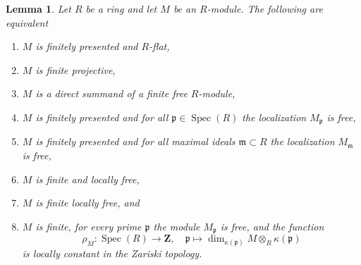 \documentclass{amsart}
\theoremstyle{plain}
\newtheorem{lemma}[subsection]{Lemma}
\theoremstyle{definition}
\theoremstyle{remark}
\numberwithin{equation}{subsection}
\def\Spec{\mathop{\mathrm{Spec}}}
\begin{document}
\begin{lemma}
\label{algebra-lemma-finite-projective}
Let $R$ be a ring and let $M$ be an $R$-module.
The following are equivalent
\begin{enumerate}
\item $M$ is finitely presented and $R$-flat,
\item $M$ is finite projective,
\item $M$ is a direct summand of a finite free $R$-module,
\item $M$ is finitely presented and
for all $\mathfrak p \in \Spec(R)$ the
localization $M_{\mathfrak p}$ is free,
\item $M$ is finitely presented and
for all maximal ideals $\mathfrak m \subset R$ the
localization $M_{\mathfrak m}$ is free,
\item $M$ is finite and locally free,
\item $M$ is finite locally free, and
\item $M$ is finite, for every prime $\mathfrak p$ the module
$M_{\mathfrak p}$ is free, and the function
$$
\rho_M : \Spec(R) \to \mathbf{Z}, \quad
\mathfrak p
\longmapsto
\dim_{\kappa(\mathfrak p)} M \otimes_R \kappa(\mathfrak p)
$$
is locally constant in the Zariski topology.
\end{enumerate}
\end{lemma}
\end{document}
